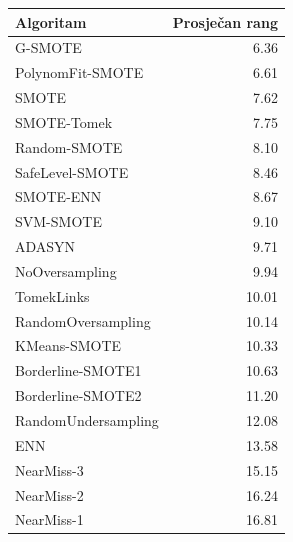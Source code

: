 \begin{tabular}{lr}
\toprule
Algoritam & Prosječan rang \\
\midrule
G-SMOTE & 6.36 \\
PolynomFit-SMOTE & 6.61 \\
SMOTE & 7.62 \\
SMOTE-Tomek & 7.75 \\
Random-SMOTE & 8.10 \\
SafeLevel-SMOTE & 8.46 \\
SMOTE-ENN & 8.67 \\
SVM-SMOTE & 9.10 \\
ADASYN & 9.71 \\
NoOversampling & 9.94 \\
TomekLinks & 10.01 \\
RandomOversampling & 10.14 \\
KMeans-SMOTE & 10.33 \\
Borderline-SMOTE1 & 10.63 \\
Borderline-SMOTE2 & 11.20 \\
RandomUndersampling & 12.08 \\
ENN & 13.58 \\
NearMiss-3 & 15.15 \\
NearMiss-2 & 16.24 \\
NearMiss-1 & 16.81 \\
\bottomrule
\end{tabular}
